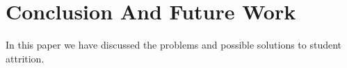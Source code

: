 \chapter{Conclusion And Future Work}
In this paper we have discussed the problems and possible solutions to student attrition.